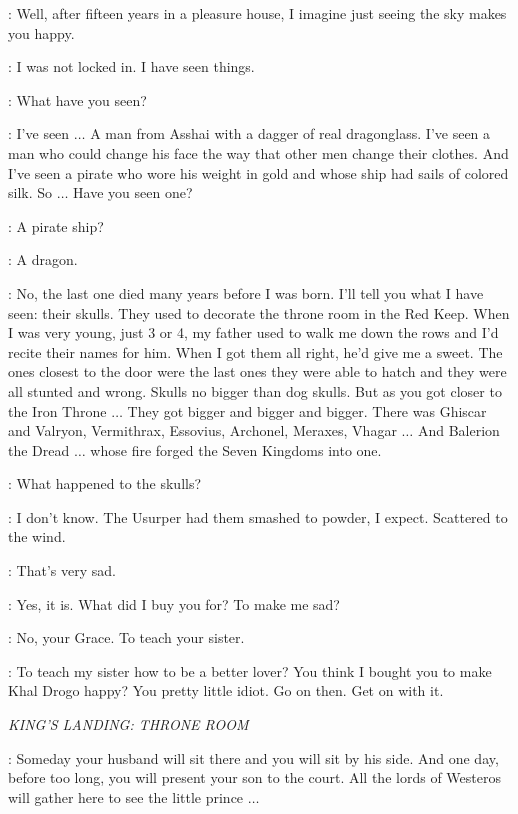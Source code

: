 \VISERYS: Well, after fifteen years in a pleasure house, I imagine just seeing the sky makes you happy. 

\DOREAH: I was not locked in. I have seen things. 

\VISERYS: What have you seen? 

\DOREAH: I've seen $\ldots$ A man from Asshai with a dagger of real dragonglass. I've seen a man who could change his face the way that other men change their clothes. And I've seen a pirate who wore his weight in gold and whose ship had sails of colored silk. So $\ldots$ Have you seen one? 

\VISERYS: A pirate ship? 

\DOREAH: A dragon. 

\VISERYS: No, the last one died many years before I was born. I'll tell you what I have seen: their skulls. They used to decorate the throne room in the Red Keep.  When I was very young, just 3 or 4, my father used to walk me down the rows and I'd recite their names for him. When I got them all right, he'd give me a sweet. The ones closest to the door were the last ones they were able to hatch and they were all stunted and wrong. Skulls no bigger than dog skulls. But as you got closer to the Iron Throne $\ldots$ They got bigger and bigger and bigger. There was Ghiscar and Valryon, Vermithrax, Essovius, Archonel, Meraxes, Vhagar $\ldots$ And Balerion the Dread $\ldots$ whose fire forged the Seven Kingdoms into one. 

\DOREAH: What happened to the skulls? 

\VISERYS: I don't know. The Usurper had them smashed to powder, I expect. Scattered to the wind. 

\DOREAH: That's very sad. 

\VISERYS: Yes, it is. What did I buy you for? To make me sad? 

\DOREAH: No, your Grace. To teach your sister. 

\VISERYS: To teach my sister how to be a better lover? You think I bought you to make Khal Drogo happy? You pretty little idiot. Go on then. Get on with it. 

\scene

\textit{KING'S LANDING: THRONE ROOM}


\SEPTAMORDANE: Someday your husband will sit there and you will sit by his side. And one day, before too long, you will present your son to the court. All the lords of Westeros will gather here to see the little prince $\ldots$ 

